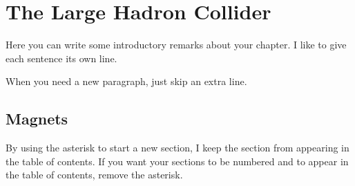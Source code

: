 

\chapter[The Large Hadron Collider][Top of Page Title]{The Large Hadron Collider}

Here you can write some introductory remarks about your chapter.
I like to give each sentence its own line.

When you need a new paragraph, just skip an extra line.

\section*{Magnets}

By using the asterisk to start a new section, I keep the section from appearing in the table of contents.
If you want your sections to be numbered and to appear in the table of contents, remove the asterisk.

